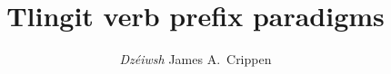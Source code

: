 \documentclass[12pt,letterpaper,landscape,oneside,article]{memoir}
\begin{document}
\pagestyle{mine}

\title{Tlingit verb prefix paradigms}
\author{\textit{Dzéiwsh} James A.\ Crippen}
\maketitle

\begin{KeepFromToc}
\tableofcontents
\listoftables
\end{KeepFromToc}








\end{document}

